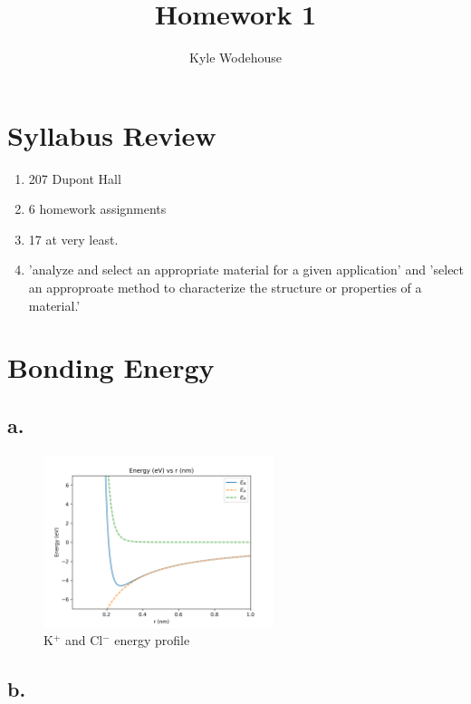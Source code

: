 \documentclass{article}
\title{\bfseries Homework 1}
\author{Kyle Wodehouse}
\begin{document}
\maketitle

\section{Syllabus Review}

\begin{enumerate}[label=(\alph*)]
    \item 207 Dupont Hall 
    \item 6 homework assignments
    \item 17 at very least. 
    \item 'analyze and select an appropriate material for a given application' and 'select an approproate method to characterize the structure or properties of a material.'
\end{enumerate}

\section{Bonding Energy}


\subsection*{a.}

\begin{figure}[h]
    \centering
    \includegraphics[width=0.6\textwidth]{2a.png}
    \caption{K$^+$ and Cl$^-$ energy profile}
\end{figure}

\subsection*{b.}
\end{document}
